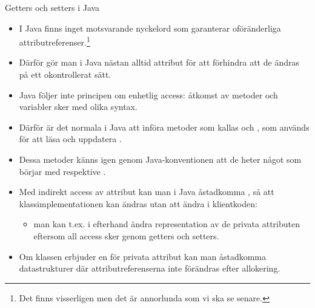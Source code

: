 \begin{Slide}{Getters och setters i Java}\SlideFontSmall
\begin{itemize}
\item I Java finns inget motsvarande nyckelord  som garanterar oföränderliga attributreferenser.\footnote{Det finns visserligen  men det är annorlunda som vi ska se senare.}

\item Därför gör man i Java nästan alltid attribut  för att förhindra att de ändras på ett okontrollerat sätt.

\item Java följer inte principen om enhetlig access: åtkomst av metoder och variabler sker med olika syntax.

\item Därför är det normala i Java att införa metoder som kallas  och , som används för att  läsa och uppdatera .

\item Dessa metoder känns igen genom Java-konventionen att de heter något som börjar med  respektive .

\item Med indirekt access av attribut kan man i Java åstadkomma , så att klassimplementationen kan ändras utan att ändra i klientkoden:
\begin{itemize}\SlideFontSmall
\item man kan t.ex. i efterhand ändra representation av de privata attributen eftersom all access sker genom getters och setters.
\end{itemize}

\item Om klassen  erbjuder en  för privata attribut kan man åstadkomma  datastrukturer där attributreferenserna inte förändras efter allokering.
\end{itemize}
\end{Slide}




